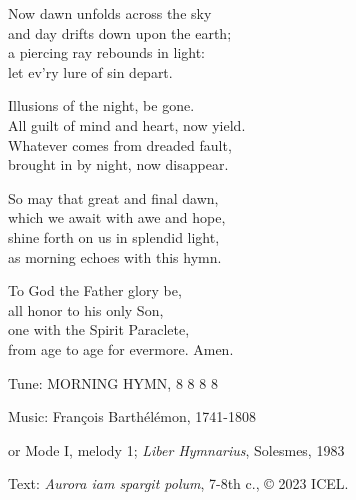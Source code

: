 \hymn

\begin{hymnverse}
Now dawn unfolds across the sky\\
and day drifts down upon the earth;\\
a piercing ray rebounds in light:\\
let ev’ry lure of sin depart.

Illusions of the night, be gone.\\
All guilt of mind and heart, now yield.\\
Whatever comes from dreaded fault,\\
brought in by night, now disappear.

So may that great and final dawn,\\
which we await with awe and hope,\\
shine forth on us in splendid light,\\
as morning echoes with this hymn.

To God the Father glory be,\\
all honor to his only Son,\\
one with the Spirit Paraclete,\\
from age to age for evermore. Amen.
\end{hymnverse}

\begin{hymnsource}
Tune: MORNING HYMN, 8 8 8 8

Music: François Barthélémon, 1741-1808

or Mode I, melody 1; \emph{Liber Hymnarius}, Solesmes, 1983

Text: \emph{Aurora iam spargit polum}, 7-8th c., © 2023 ICEL.
\end{hymnsource}
